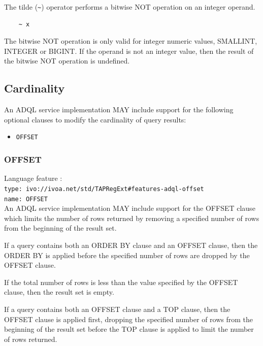 \documentclass[11pt,a4paper]{ivoa}
\begin{document}
The tilde (\verb:~:) operator performs a bitwise NOT operation on an integer operand.

\begin{verbatim}
    ~ x
\end{verbatim}

The bitwise NOT operation is only valid for integer numeric values, 
SMALLINT, INTEGER or BIGINT.
If the operand is not an integer value, then the result of the bitwise
NOT operation is undefined.

\subsection{Cardinality}
\label{sec:cardinality}

An ADQL service implementation MAY include support for the following optional
clauses to modify the cardinality of query results:

\begin{itemize}
    \item \verb:OFFSET:
\end{itemize}

\subsubsection{OFFSET}
\label{sec:offset}

{\footnotesize Language feature :}\\
{\footnotesize \verb|type: ivo://ivoa.net/std/TAPRegExt#features-adql-offset|}\\
{\footnotesize \verb|name: OFFSET|}\\

An ADQL service implementation MAY include support for the OFFSET clause
which limits the number of rows returned by removing a specified number
of rows from the beginning of the result set.

If a query contains both an ORDER BY clause and an OFFSET clause,
then the ORDER BY is applied before the specified number of 
rows are dropped by the OFFSET clause.

If the total number of rows is less than the value
specified by the OFFSET clause, then the result set is empty.

If a query contains both an OFFSET clause and a TOP clause,
then the OFFSET clause is applied first, dropping the specified
number of rows from the beginning of the result set before the
TOP clause is applied to limit the number of rows returned.
\end{document}
